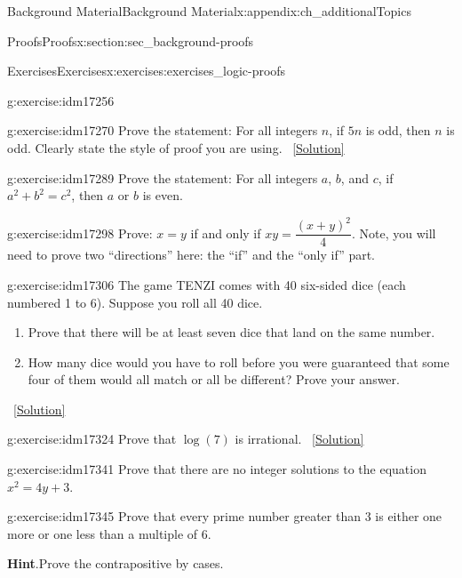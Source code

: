 \documentclass[oneside,10pt,]{book}
\numberwithin{equation}{chapter}
\begin{document}
\begin{appendixptx}{Background Material}{}{Background Material}{}{}{x:appendix:ch_additionalTopics}
\begin{sectionptx}{Proofs}{}{Proofs}{}{}{x:section:sec_background-proofs}
\begin{exercises-subsection}{Exercises}{}{Exercises}{}{}{x:exercises:exercises_logic-proofs}
\begin{divisionexercise}{7}{}{}{g:exercise:idm17256}
%
\end{divisionexercise}%
\begin{divisionexercise}{8}{}{}{g:exercise:idm17270}%
Prove the statement: For all integers \(n\), if \(5n\) is odd, then \(n\) is odd. Clearly state the style of proof you are using.%
\qquad~\hfill{\tiny\hyperlink{g:solution:idm17276-main}{[Solution]}}\end{divisionexercise}%
\begin{divisionexercise}{9}{}{}{g:exercise:idm17289}%
Prove the statement: For all integers \(a\), \(b\), and \(c\), if \(a^2 + b^2 = c^2\), then \(a\) or \(b\) is even.%
\end{divisionexercise}%
\begin{divisionexercise}{10}{}{}{g:exercise:idm17298}%
Prove: \(x=y\) if and only if \(xy=\dfrac{(x+y)^2}{4}\). Note, you will need to prove two ``directions'' here: the ``if'' and the ``only if'' part.%
\end{divisionexercise}%
\begin{divisionexercise}{11}{}{}{g:exercise:idm17306}%
The game TENZI comes with 40 six-sided dice (each numbered 1 to 6). Suppose you roll all 40 dice.%
\begin{enumerate}[label=(\alph*)]
\item{}Prove that there will be at least seven dice that land on the same number.%
\item{}How many dice would you have to roll before you were guaranteed that some four of them would all match or all be different? Prove your answer.%
\end{enumerate}
%
\qquad~\hfill{\tiny\hyperlink{g:solution:idm17313-main}{[Solution]}}\end{divisionexercise}%
\begin{divisionexercise}{12}{}{}{g:exercise:idm17324}%
Prove that \(\log(7)\) is irrational.%
\qquad~\hfill{\tiny\hyperlink{g:solution:idm17328-main}{[Solution]}}\end{divisionexercise}%
\begin{divisionexercise}{13}{}{}{g:exercise:idm17341}%
Prove that there are no integer solutions to the equation \(x^2 = 4y + 3\).%
\end{divisionexercise}%
\begin{divisionexercise}{14}{}{}{g:exercise:idm17345}%
Prove that every prime number greater than 3 is either one more or one less than a multiple of 6.%
\par\smallskip%
\noindent\textbf{Hint}.\hypertarget{g:hint:idm17348}{}\quad{}Prove the contrapositive by cases.%

\end{divisionexercise}
\end{exercises-subsection}
\end{sectionptx}
\end{appendixptx}
\end{document}
